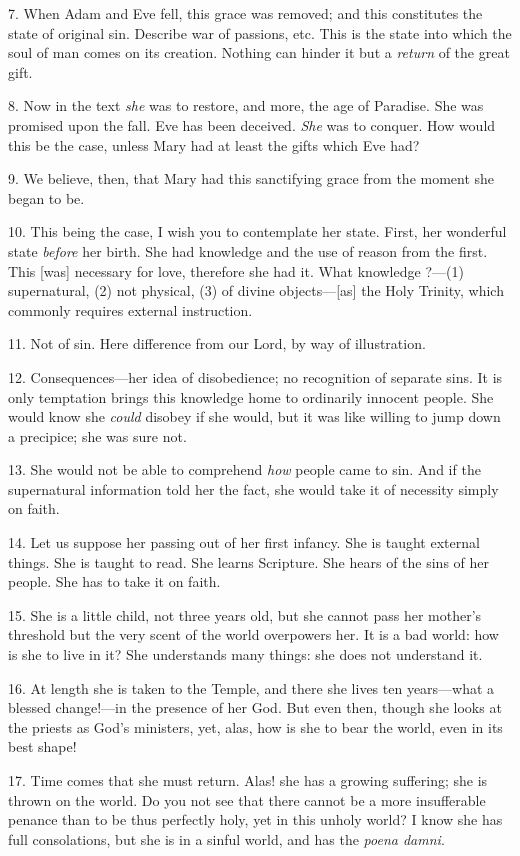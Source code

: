 7. When Adam and Eve fell, this grace was
removed; and this constitutes the state of original sin. Describe war
of passions, etc. This is the state into which the soul of man comes
on its creation. Nothing can hinder it but a \emph{return} of the
great gift.

8. Now in the text \emph{she} was to restore, and
more, the age of Paradise. She was promised upon the fall. Eve has
been deceived. \emph{She} was to conquer. How would this be the case,
unless Mary had at least the gifts which Eve had?

9. We believe, then, that Mary had this
sanctifying grace from the moment she began to be.

10. This being the case, I wish you to
contemplate her state. First, her wonderful state \emph{before} her
birth. She had knowledge and the use of reason from the first. This
[was] necessary for love, therefore she had it. What knowledge ?—(1)
supernatural, (2) not physical, (3) of divine objects—[as] the Holy
Trinity, which commonly requires external instruction.

11. Not of sin. Here difference from our Lord, by
way of illustration.

12. Consequences—her idea of disobedience; no
recognition of separate sins. It is only temptation brings this
knowledge home to ordinarily innocent people. She would know she \emph{could}
disobey if she would, but it was like willing to jump down a
precipice; she was sure not.

13. She would not be able to comprehend \emph{how}
people came to sin. And if the supernatural information told her the
fact, she would take it of necessity simply on faith.

14. Let us suppose her passing out of her first
infancy. She is taught external things. She is taught to read. She
learns Scripture. She hears of the sins of her people. She has to take
it on faith.

15. She is a little child, not three years old,
but she cannot pass her mother's threshold but the very scent of the
world overpowers her. It is a bad world: how is she to live in it? She
understands many things: she does not understand it.

16. At length she is taken to the Temple, and
there she lives ten years—what a blessed change!—in the presence
of her God. But even then, though she looks at the priests as God's
ministers, yet, alas, how is she to bear the world, even in its best
shape!

17. Time comes that she must return. Alas! she
has a growing suffering; she is thrown on the world. Do you not see
that there cannot be a more insufferable penance than to be thus
perfectly holy, yet in this unholy world? I know she has full
consolations, but she is in a sinful world, and has the \emph{poena damni}.

